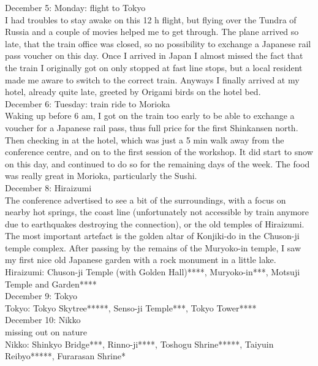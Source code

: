December 5: Monday: flight to Tokyo\\
I had troubles to stay awake on this 12 h flight, but flying over the Tundra of Russia and a couple of movies helped me to get through. The plane arrived so late, that the train office was closed, so no possibility to exchange a Japanese rail pass voucher on this day. Once I arrived in Japan I almost missed the fact that the train I originally got on only stopped at fast line stops, but a local resident made me aware to switch to the correct train. Anyways I finally arrived at my hotel, already quite late, greeted by Origami birds on the hotel bed.\\

December 6: Tuesday: train ride to Morioka\\
Waking up before 6 am, I got on the train too early to be able to exchange a voucher for a Japanese rail pass, thus full price for the first Shinkansen north. Then checking in at the hotel, which was just a 5 min walk away from the conference centre, and on to the first session of the workshop. It did start to snow on this day, and continued to do so for the remaining days of the week. The food was really great in Morioka, particularly the Sushi.\\

December 8: Hiraizumi\\
The conference advertised to see a bit of the surroundings, with a focus on nearby hot springs, the coast line (unfortunately not accessible by train anymore due to earthquakes destroying the connection), or the old temples of Hiraizumi. The most important artefact is the golden altar of Konjiki-do in the Chuson-ji temple complex. After passing by the remains of the Muryoko-in temple, I saw my first nice old Japanese garden with a rock monument in a little lake.\\

Hiraizumi: Chuson-ji Temple (with Golden Hall)****, Muryoko-in***, Motsuji Temple and Garden****\\

December 9: Tokyo\\
Tokyo: Tokyo Skytree*****, Senso-ji Temple***, Tokyo Tower****\\

December 10: Nikko\\
missing out on nature\\

Nikko: Shinkyo Bridge***, Rinno-ji****, Toshogu Shrine*****, Taiyuin Reibyo*****, Furarasan Shrine*\\

